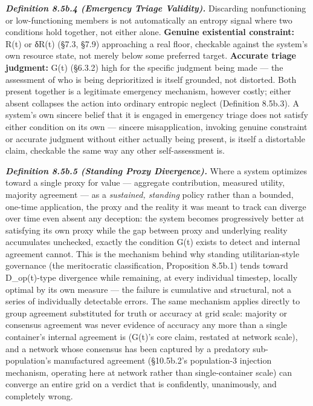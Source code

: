 \documentclass[
]{article}
\begin{document}
\emph{\textbf{Definition 8.5b.4 (Emergency Triage Validity).}}
Discarding nonfunctioning or low-functioning members is not
automatically an entropy signal where two conditions hold together, not
either alone. \textbf{Genuine existential constraint:} R(t) or δR(t)
(§7.3, §7.9) approaching a real floor, checkable against the system's
own resource state, not merely below some preferred target.
\textbf{Accurate triage judgment:} G(t) (§6.3.2) high for the specific
judgment being made --- the assessment of who is being deprioritized is
itself grounded, not distorted. Both present together is a legitimate
emergency mechanism, however costly; either absent collapses the action
into ordinary entropic neglect (Definition 8.5b.3). A system's own
sincere belief that it is engaged in emergency triage does not satisfy
either condition on its own --- sincere misapplication, invoking genuine
constraint or accurate judgment without either actually being present,
is itself a distortable claim, checkable the same way any other
self-assessment is.

\emph{\textbf{Definition 8.5b.5 (Standing Proxy Divergence).}} Where a
system optimizes toward a single proxy for value --- aggregate
contribution, measured utility, majority agreement --- as a
\emph{sustained, standing} policy rather than a bounded, one-time
application, the proxy and the reality it was meant to track can diverge
over time even absent any deception: the system becomes progressively
better at satisfying its own proxy while the gap between proxy and
underlying reality accumulates unchecked, exactly the condition G(t)
exists to detect and internal agreement cannot. This is the mechanism
behind why standing utilitarian-style governance (the meritocratic
classification, Proposition 8.5b.1) tends toward D\_op(t)-type
divergence while remaining, at every individual timestep, locally
optimal by its own measure --- the failure is cumulative and structural,
not a series of individually detectable errors. The same mechanism
applies directly to group agreement substituted for truth or accuracy at
grid scale: majority or consensus agreement was never evidence of
accuracy any more than a single container's internal agreement is
(G(t)'s core claim, restated at network scale), and a network whose
consensus has been captured by a predatory sub-population's manufactured
agreement (§10.5b.2's population-3 injection mechanism, operating here
at network rather than single-container scale) can converge an entire
grid on a verdict that is confidently, unanimously, and completely
wrong.
\end{document}
